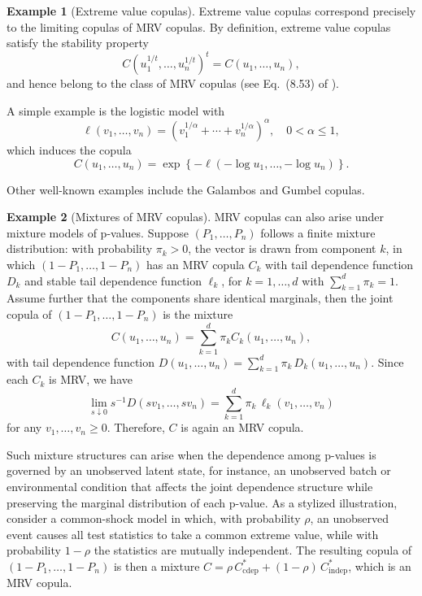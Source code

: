 \documentclass[12pt]{article}
\theoremstyle{plain}
\theoremstyle{plain}
\theoremstyle{definition}
\newtheorem{exmp}{Example}[section]
\begin{document}
\begin{exmp}[Extreme value copulas]
Extreme value copulas correspond precisely to the limiting copulas of MRV copulas. By definition, extreme value copulas satisfy the stability property
\[
C(u_1^{1/t},\dots,u_n^{1/t})^t = C(u_1,\dots,u_n),
\]
and hence belong to the class of MRV copulas (see Eq.~(8.53) of \cite{beirlant2006statistics}).

A simple example is the logistic model with
\[
\ell(v_1,\dots,v_n)= (v_1^{1/\alpha}+\cdots+v_n^{1/\alpha})^\alpha, \quad 0<\alpha\le1,
\]
which induces the copula
\[
C(u_1,\dots,u_n)
= \exp\left\{-\ell(-\log u_1,\dots,-\log u_n)\right\}.
\]

Other well-known examples include the Galambos and Gumbel copulas.
\end{exmp}



\begin{exmp}[Mixtures of MRV copulas]
 MRV copulas can also arise under mixture models of p-values. Suppose $(P_1,\dots,P_n)$ follows a finite mixture distribution: with probability $\pi_k > 0$, the vector is drawn from component $k$, in which $(1-P_1,\dots,1-P_n)$ has an MRV copula $C_k$ with tail dependence function $D_k$ and stable tail dependence function $\ell_k$, for $k = 1, \dots , d$ with $\sum_{k=1}^d\pi_k = 1$. Assume further that the components share identical marginals, then the joint copula of $(1-P_1,\dots,1-P_n)$ is the mixture
$$C(u_1, \dots, u_n) = \sum_{k=1}^d \pi_k C_k(u_1, \dots, u_n),$$ with tail dependence function $D(u_1,\dots,u_n)
= \sum_{k=1}^d \pi_k\, D_k(u_1,\dots,u_n)$. Since each $C_k$ is MRV, we have
$$\lim_{s \downarrow 0} s^{-1} D(s v_1, \dots, s v_n) = \sum_{k=1}^d \pi_k \, \ell_k(v_1, \dots, v_n)$$
for any $v_1,\dots,v_n \ge 0$. Therefore, $C$ is again an MRV copula.
 



Such mixture structures can arise when the dependence among p-values is governed by an unobserved latent state, for instance, an unobserved batch or environmental condition that affects the joint dependence structure while preserving the marginal distribution of each p-value. As a stylized illustration, consider a common-shock model in which, with probability $\rho$, an unobserved event causes all test statistics to take a common extreme value, while with probability $1-\rho$ the statistics are mutually independent. The resulting copula of $(1-P_1, \dots, 1-P_n)$ is then a mixture
$C = \rho \, C^*_{\mathrm{cdep}} + (1-\rho) \, C^*_{\mathrm{indep}}$, which is an MRV copula.


\end{exmp}
\end{document}
